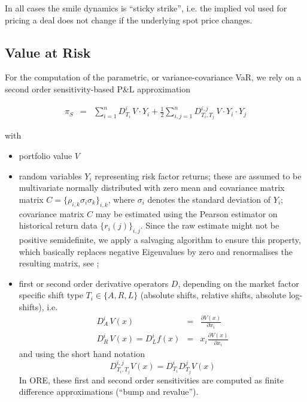 \documentclass[12pt, a4paper]{article}
\begin{document}
\begin{appendix}
\medskip
In all cases the smile dynamics is ``sticky strike'', i.e. the implied vol used for pricing a deal does not change if
the underlying spot price changes.

\subsection{Value at Risk}\label{sec:app_var}

For the computation of the parametric, or variance-covariance VaR, we rely on a second order sensitivity-based P\&L approximation

\begin{eqnarray}\label{taylorPl2}
  \pi_S & = & \sum_{i=1}^n D^i_{T_i}\,V\cdot Y_i 
        + \frac{1}{2} \sum_{i,j=1}^n D^{i,j}_{T_i,T_j}\,V\cdot Y_i\cdot Y_j
\end{eqnarray}

with 
\begin{itemize}
\item portfolio value $V$
\item random variables $Y_i$ representing risk factor returns; these are assumed to be multivariate normally distributed with zero mean
and covariance matrix matrix $C = \{ \rho_{i,k} \sigma_i \sigma_k \}_{i,k}$, where $\sigma_i$ denotes the standard
deviation of $Y_i$; covariance matrix $C$ may be estimated using the Pearson estimator on historical return data
$\{ r_i(j) \}_{i,j}$. Since the raw estimate might not be positive semidefinite, we apply a salvaging algorithm to
ensure this property, which basically replaces negative Eigenvalues by zero and renormalises the resulting matrix, see
\cite{corrSalv};
\item first or second order derivative operators $D$, depending
on the market factor specific shift type $T_i \in \{ A,R,L \}$ (absolute shifts, relative shifts, absolute log-shifts), i.e.
\begin{eqnarray*}\label{derivs}
  D^i_A \,V(x) &=& \frac{\partial V(x)}{\partial x_i} \\
  D^i_R \,V(x) = D^i_L f(x) &=& x_i\frac{\partial V(x)}{\partial x_i}
\end{eqnarray*}
and using the short hand notation
\begin{equation*}
  D^{i,j}_{T_i,T_j} V(x) = D^i_{T_i} D^j_{T_j} V(x)
\end{equation*}
In ORE, these first and second order sensitivities are computed as finite difference
approximations (``bump and revalue'').
\end{itemize}


\end{appendix}
\end{document}

